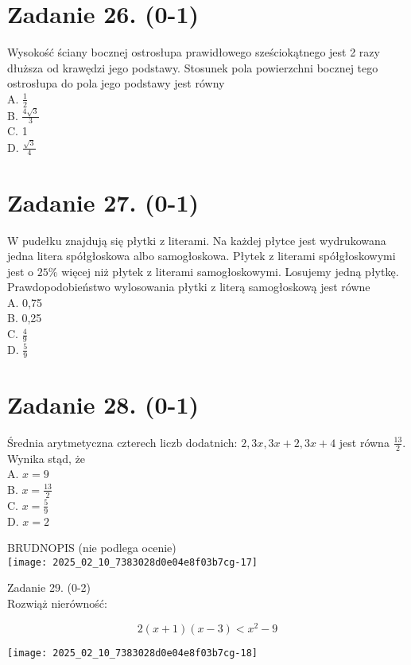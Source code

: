 \documentclass[10pt]{article}
\begin{document}
\section*{Zadanie 26. (0-1)}
Wysokość ściany bocznej ostrosłupa prawidłowego sześciokątnego jest 2 razy dłuższa od krawędzi jego podstawy. Stosunek pola powierzchni bocznej tego ostrosłupa do pola jego podstawy jest równy\\
A. \(\frac{1}{2}\)\\
B. \(\frac{4 \sqrt{3}}{3}\)\\
C. 1\\
D. \(\frac{\sqrt{3}}{4}\)

\section*{Zadanie 27. (0-1)}
W pudełku znajdują się płytki z literami. Na każdej płytce jest wydrukowana jedna litera spółgłoskowa albo samogłoskowa. Płytek z literami spółgłoskowymi jest o \(25 \%\) więcej niż płytek z literami samogłoskowymi. Losujemy jedną płytkę. Prawdopodobieństwo wylosowania płytki z literą samogłoskową jest równe\\
A. 0,75\\
B. 0,25\\
C. \(\frac{4}{9}\)\\
D. \(\frac{5}{9}\)

\section*{Zadanie 28. (0-1)}
Średnia arytmetyczna czterech liczb dodatnich: \(2,3 x, 3 x+2,3 x+4\) jest równa \(\frac{13}{2}\). Wynika stąd, że\\
A. \(x=9\)\\
B. \(x=\frac{13}{2}\)\\
C. \(x=\frac{5}{9}\)\\
D. \(x=2\)

BRUDNOPIS (nie podlega ocenie)\\
\texttt{[image: 2025\_02\_10\_7383028d0e04e8f03b7cg-17]}

Zadanie 29. (0-2)\\
Rozwiąż nierówność:

\[
2(x+1)(x-3)<x^{2}-9
\]

\begin{center}
\texttt{[image: 2025\_02\_10\_7383028d0e04e8f03b7cg-18]}
\end{center}
\end{document}
